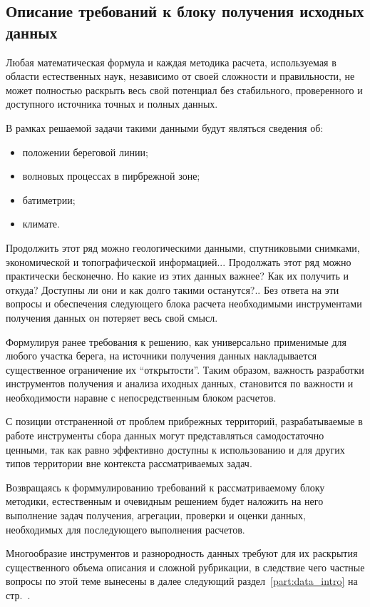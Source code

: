 
\subsection{Описание требований к блоку получения исходных данных}

Любая математическая формула и каждая методика расчета, используемая в области естественных наук, независимо от своей сложности и правильности, не может полностью раскрыть весь свой потенциал без стабильного, проверенного и доступного источника точных и полных данных.

В рамках решаемой задачи такими данными будут являться сведения об:
\begin{itemize}
    \item положении береговой линии;
    \item волновых процессах в пирбрежной зоне;
    \item батиметрии;
    \item климате.
\end{itemize}

Продолжить этот ряд можно геологическими данными, спутниковыми снимками, экономической и топографической информацией...
Продолжать этот ряд можно практически бесконечно.
Но какие из этих данных важнее?
Как их получить и откуда?
Доступны ли они и как долго такими останутся?..
Без ответа на эти вопросы и обеспечения следующего блока расчета необходимыми инструментами получения данных он потеряет весь свой смысл.

Формулируя ранее требования к решению, как универсально применимые для любого участка берега, на источники получения данных накладывается существенное ограничение их \enquote{открытости}.
Таким образом, важность разработки инструментов получения и анализа иходных данных, становится по важности и необходимости наравне с непосредственным блоком расчетов.

С позиции отстраненной от проблем прибрежных территорий, разрабатываемые в работе инструменты сбора данных могут представляться самодостаточно ценными, так как равно эффективно доступны к использованию и для других типов территории вне контекста рассматриваемых задач.

Возвращаясь к форммулированию требований к рассматриваемому блоку методики, естественным и очевидным решением будет наложить на него выполнение задач получения, агрегации, проверки и оценки данных, необходимых для последующего выполнения расчетов.

Многообразие инструментов и разнородность данных требуют для их раскрытия существенного объема описания и сложной рубрикации, в следствие чего частные вопросы по этой теме вынесены в далее следующий раздел~\ref{part:data_intro} на стр.~\pageref{part:data_intro}.

